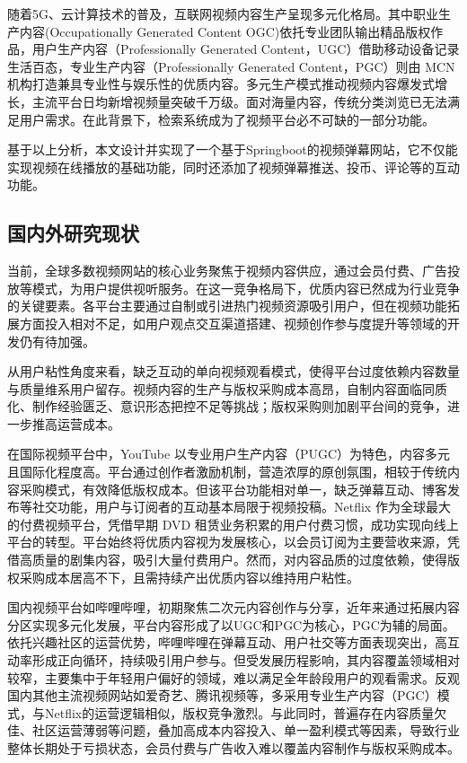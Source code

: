 随着5G、云计算技术的普及，互联网视频内容生产呈现多元化格局。其中职业生产内容(Occupationally Generated Content OGC)依托专业团队输出精品版权作品，用户生产内容（Professionally Generated Content，UGC）借助移动设备记录生活百态，专业生产内容（Professionally Generated Content，PGC）则由 MCN 机构打造兼具专业性与娱乐性的优质内容。\cite{1023409711.nh}多元生产模式推动视频内容爆发式增长，主流平台日均新增视频量突破千万级。面对海量内容，传统分类浏览已无法满足用户需求\label{互联网内容爆炸}。在此背景下，检索系统成为了视频平台必不可缺的一部分功能。

基于以上分析，本文设计并实现了一个基于Springboot的视频弹幕网站，它不仅能实现视频在线播放的基础功能，同时还添加了视频弹幕推送、投币、评论等的互动功能。


\subsection{国内外研究现状}

当前，全球多数视频网站的核心业务聚焦于视频内容供应，通过会员付费、广告投放等模式，为用户提供视听服务。在这一竞争格局下，优质内容已然成为行业竞争的关键要素。各平台主要通过自制或引进热门视频资源吸引用户，但在视频功能拓展方面投入相对不足，如用户观点交互渠道搭建、视频创作参与度提升等领域的开发仍有待加强。

从用户粘性角度来看，缺乏互动的单向视频观看模式，使得平台过度依赖内容数量与质量维系用户留存。视频内容的生产与版权采购成本高昂，自制内容面临同质化、制作经验匮乏、意识形态把控不足等挑战；版权采购则加剧平台间的竞争，进一步推高运营成本。

在国际视频平台中，YouTube 以专业用户生产内容（PUGC）为特色，内容多元且国际化程度高。平台通过创作者激励机制，营造浓厚的原创氛围，相较于传统内容采购模式，有效降低版权成本。但该平台功能相对单一，缺乏弹幕互动、博客发布等社交功能，用户与订阅者的互动基本局限于视频投稿。\cite{RN03}Netflix 作为全球最大的付费视频平台，凭借早期 DVD 租赁业务积累的用户付费习惯，成功实现向线上平台的转型。平台始终将优质内容视为发展核心，以会员订阅为主要营收来源，凭借高质量的剧集内容，吸引大量付费用户。然而，对内容品质的过度依赖，使得版权采购成本居高不下，且需持续产出优质内容以维持用户粘性。

国内视频平台如哔哩哔哩，初期聚焦二次元内容创作与分享，近年来通过拓展内容分区实现多元化发展，平台内容形成了以UGC和PGC为核心，PGC为辅的局面。依托兴趣社区的运营优势，哔哩哔哩在弹幕互动、用户社交等方面表现突出，高互动率形成正向循环，持续吸引用户参与。但受发展历程影响，其内容覆盖领域相对较窄，主要集中于年轻用户偏好的领域，难以满足全年龄段用户的观看需求。反观国内其他主流视频网站如爱奇艺、腾讯视频等，多采用专业生产内容（PGC）模式，与Netflix的运营逻辑相似，版权竞争激烈。与此同时，普遍存在内容质量欠佳、社区运营薄弱等问题，叠加高成本内容投入、单一盈利模式等因素，导致行业整体长期处于亏损状态，会员付费与广告收入难以覆盖内容制作与版权采购成本。

